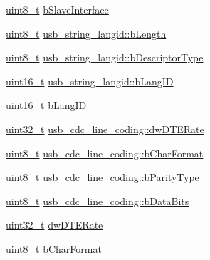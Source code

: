 \begin{DoxyCompactItemize}
\hyperlink{stdint_8h_aba7bc1797add20fe3efdf37ced1182c5}{uint8\-\_\-t} \hyperlink{group___p_i_o_s___u_s_b___d_e_f_s_gae9505f80bd091509e065986a7b9af9ac}{b\-Slave\-Interface}
\item 
\hyperlink{stdint_8h_aba7bc1797add20fe3efdf37ced1182c5}{uint8\-\_\-t} \hyperlink{group___p_i_o_s___u_s_b___d_e_f_s_ga5d1ac83f6f30a062e5f6d89c4aa15c44}{usb\-\_\-string\-\_\-langid\-::b\-Length}
\item 
\hyperlink{stdint_8h_aba7bc1797add20fe3efdf37ced1182c5}{uint8\-\_\-t} \hyperlink{group___p_i_o_s___u_s_b___d_e_f_s_gafbb47b004fd7a76505e51c1f1530351f}{usb\-\_\-string\-\_\-langid\-::b\-Descriptor\-Type}
\item 
\hyperlink{stdint_8h_a273cf69d639a59973b6019625df33e30}{uint16\-\_\-t} \hyperlink{group___p_i_o_s___u_s_b___d_e_f_s_ga0a47e7587d6595703617971546741a5f}{usb\-\_\-string\-\_\-langid\-::b\-Lang\-I\-D}
\item 
\hyperlink{stdint_8h_a273cf69d639a59973b6019625df33e30}{uint16\-\_\-t} \hyperlink{group___p_i_o_s___u_s_b___d_e_f_s_gae9f9ee602591bc9fbf16645639988db1}{b\-Lang\-I\-D}
\item 
\hyperlink{stdint_8h_a435d1572bf3f880d55459d9805097f62}{uint32\-\_\-t} \hyperlink{group___p_i_o_s___u_s_b___d_e_f_s_gabba439cd113503e9223c9d61865319d2}{usb\-\_\-cdc\-\_\-line\-\_\-coding\-::dw\-D\-T\-E\-Rate}
\item 
\hyperlink{stdint_8h_aba7bc1797add20fe3efdf37ced1182c5}{uint8\-\_\-t} \hyperlink{group___p_i_o_s___u_s_b___d_e_f_s_gaae309443995f9fe84f44a78bd866cc1a}{usb\-\_\-cdc\-\_\-line\-\_\-coding\-::b\-Char\-Format}
\item 
\hyperlink{stdint_8h_aba7bc1797add20fe3efdf37ced1182c5}{uint8\-\_\-t} \hyperlink{group___p_i_o_s___u_s_b___d_e_f_s_gad1b91d6baa7411fa9f6341140f5ac216}{usb\-\_\-cdc\-\_\-line\-\_\-coding\-::b\-Parity\-Type}
\item 
\hyperlink{stdint_8h_aba7bc1797add20fe3efdf37ced1182c5}{uint8\-\_\-t} \hyperlink{group___p_i_o_s___u_s_b___d_e_f_s_ga81e0e896a0524b8db945e1a8b50668e6}{usb\-\_\-cdc\-\_\-line\-\_\-coding\-::b\-Data\-Bits}
\item 
\hyperlink{stdint_8h_a435d1572bf3f880d55459d9805097f62}{uint32\-\_\-t} \hyperlink{group___p_i_o_s___u_s_b___d_e_f_s_ga1c7eaa2f09ca8253de1711d01e05e02c}{dw\-D\-T\-E\-Rate}
\item 
\hyperlink{stdint_8h_aba7bc1797add20fe3efdf37ced1182c5}{uint8\-\_\-t} \hyperlink{group___p_i_o_s___u_s_b___d_e_f_s_ga296b7b4f7eaba228afa94b5f9854b86b}{b\-Char\-Format}
\item 

\end{DoxyCompactItemize}

